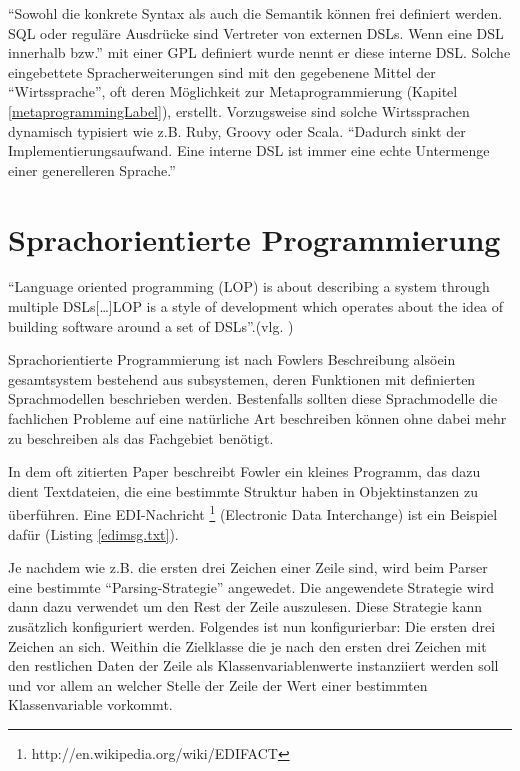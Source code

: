 \documentclass[11pt,english,ngerman, headsepline]{scrreprt}
\begin{document}
``Sowohl die konkrete Syntax als auch die Semantik können frei definiert
werden. SQL oder reguläre Ausdrücke sind Vertreter von externen DSLs. Wenn eine
DSL innerhalb bzw.'' \cite{wikidsl}
mit einer GPL definiert wurde nennt er diese interne DSL. Solche eingebettete Spracherweiterungen sind mit den
gegebenene Mittel der ``Wirtssprache'', oft deren Möglichkeit zur
Metaprogrammierung (Kapitel \ref{metaprogrammingLabel}), erstellt.
Vorzugsweise sind solche Wirtssprachen dynamisch typisiert wie z.B. Ruby, Groovy
oder Scala. 
``Dadurch sinkt der Implementierungsaufwand. Eine interne DSL ist immer eine echte
Untermenge einer generelleren Sprache.'' \cite{wikidsl}
 


\section{Sprachorientierte Programmierung}

``Language oriented programming (LOP) is about describing a system through
multiple DSLs[\ldots]LOP is a style of development which operates about
the idea of building software around a set of DSLs''.(vlg.
\cite{fowler2005language})


Sprachorientierte Programmierung ist nach Fowlers Beschreibung alsöein
gesamtsystem bestehend aus subsystemen, deren Funktionen mit definierten
Sprachmodellen beschrieben werden. Bestenfalls sollten diese Sprachmodelle
die fachlichen Probleme auf eine natürliche Art beschreiben können ohne dabei
mehr zu beschreiben als das Fachgebiet benötigt.

In dem oft zitierten Paper beschreibt Fowler ein kleines Programm, das dazu
dient Textdateien, die eine bestimmte Struktur haben in Objektinstanzen zu
überführen.
Eine EDI-Nachricht \footnote{http://en.wikipedia.org/wiki/EDIFACT} (Electronic
Data Interchange) ist ein Beispiel dafür (Listing \ref{edimsg.txt}).



Je nachdem wie z.B. die ersten drei Zeichen einer Zeile sind, wird beim
Parser eine bestimmte ``Parsing-Strategie'' angewedet. \cite{gamma1995design}
Die angewendete Strategie wird dann dazu verwendet um den Rest der Zeile
auszulesen. Diese Strategie kann zusätzlich konfiguriert werden. 
Folgendes ist nun konfigurierbar: Die ersten drei Zeichen an sich. Weithin die
Zielklasse die je nach den ersten drei Zeichen mit den restlichen Daten der
Zeile als Klassenvariablenwerte instanziiert werden soll und vor allem an
welcher Stelle der Zeile der Wert einer bestimmten Klassenvariable vorkommt.
\end{document}
